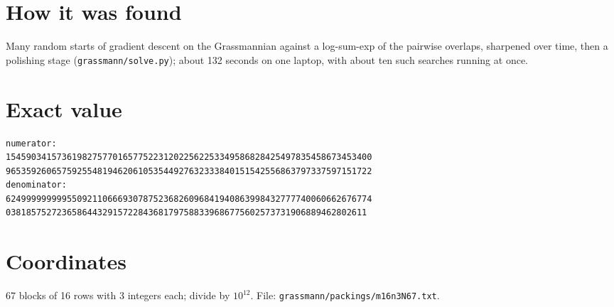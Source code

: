\documentclass[11pt,a4paper]{article}
\begin{document}
\section{How it was found}
Many random starts of gradient descent on the Grassmannian against a log-sum-exp of the pairwise overlaps, sharpened over time, then a polishing stage (\texttt{grassmann/solve.py}); about 132 seconds on one laptop, with about ten such searches running at once.


\appendix
\section{Exact value}
{\small
\begin{verbatim}
numerator:
154590341573619827577016577522312022562253349586828425497835458673453400
965359260657592554819462061053544927632333840151542556863797337597151722
denominator:
624999999999550921106669307875236826096841940863998432777740060662676774
03818575272365864432915722843681797588339686775602573731906889462802611
\end{verbatim}}

\section{Coordinates}
67 blocks of 16 rows with 3 integers each; divide by $10^{12}$. File: \texttt{grassmann/packings/m16n3N67.txt}.
{\tiny
\begin{multicols}{3}
\end{multicols}}
\end{document}
